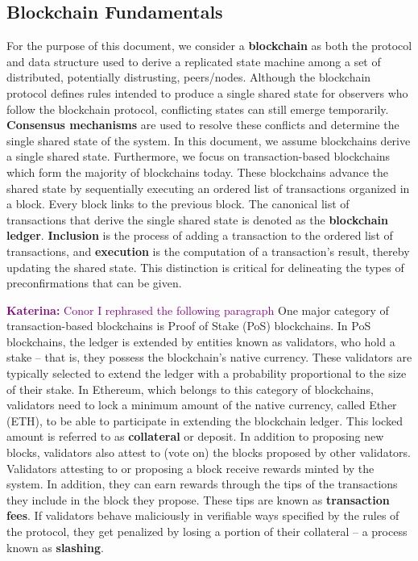 \documentclass[a4paper]{article}
\theoremstyle{boldstyle}
\newcommand{\qb}[1]{\textcolor{red}{\textbf{Quentin:} #1}}
\newcommand{\ks}[1]{\textcolor{purple}{\textbf{Katerina:} #1}}
\begin{document}
    \subsection{Blockchain Fundamentals}
    \label{subsec:BlockchainFundamentals}
    For the purpose of this document, we consider a \textbf{blockchain} as both the protocol and data structure used to derive a replicated state machine among a set of distributed, potentially distrusting, peers/nodes. Although the blockchain protocol defines rules %
    intended to produce a single shared state for observers who follow the blockchain protocol, conflicting states can still emerge temporarily. \textbf{Consensus mechanisms} are used to resolve these conflicts and determine the single shared state of the system. In this document, we assume blockchains derive a single shared state. Furthermore, we focus on transaction-based blockchains which form the majority of blockchains today. These blockchains advance the shared state by sequentially executing an ordered list of transactions organized in a block. Every block links to the previous block. The canonical list of transactions that derive the single shared state is denoted as the \textbf{blockchain ledger}. \textbf{Inclusion} is the process of adding a transaction to the ordered list of transactions, and \textbf{execution} is the computation of a transaction's result, thereby updating the shared state. This distinction is critical for delineating the types of preconfirmations that can be given. 
    
    \ks{ Conor I rephrased the following paragraph} One major category of transaction-based blockchains is Proof of Stake (PoS) blockchains. In PoS blockchains, the ledger is extended by entities known as validators, who hold a stake -- that is, they possess the blockchain’s native currency. These validators are typically selected to extend the ledger with a probability proportional to the size of their stake. %
    In Ethereum, which belongs to this category of blockchains, validators need to lock a minimum amount of the native currency, called Ether (ETH), to be able to participate in extending the blockchain ledger. This locked amount is referred to as \textbf{collateral} or deposit. In addition to proposing new blocks, validators also attest to (vote on) the blocks proposed by other validators. Validators attesting to or proposing a block receive rewards minted by the system. In addition, they can earn rewards through the tips of the transactions they include in the block they propose. These tips are known as \textbf{transaction fees}. If validators behave maliciously in verifiable ways specified by the rules of the protocol, they get penalized by losing a portion of their collateral -- a process known as \textbf{slashing}. 
    
\end{document}
